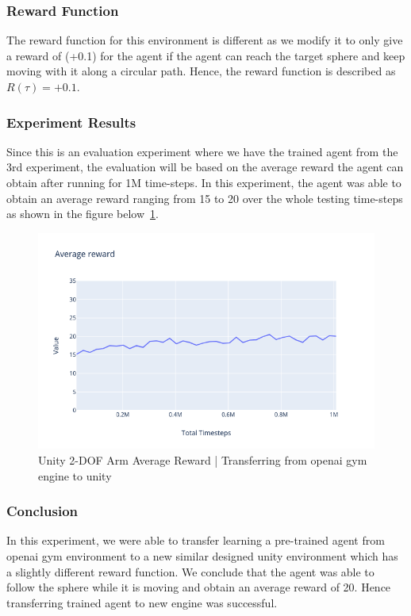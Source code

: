 \subsubsection{Reward Function}

The reward function for this environment is different as we modify it to only give a reward of (+0.1) for the agent if the agent can reach the target sphere and keep moving with it along a circular path. Hence, the reward function is described as \textbf{\(R(\tau)=+0.1\)}.

\subsubsection{Experiment Results}

Since this is an evaluation experiment where we have the trained agent from the 3rd experiment, the evaluation will be based on the average reward the agent can obtain after running for 1M time-steps. In this experiment, the agent was able to obtain an average reward ranging from 15 to 20 over the whole testing time-steps as shown in the figure below~\ref{fig:unity2d_avg_reward}.

\begin{figure}[!htb]
		\centering
		\includegraphics[width=0.7\linewidth]{figures/exps/unity2d.png}
		\caption{Unity 2-DOF Arm Average Reward | Transferring from openai gym engine to unity}
		\label{fig:unity2d_avg_reward}
\end{figure}


\subsubsection{Conclusion}

In this experiment, we were able to transfer learning a pre-trained agent from openai gym environment to a new similar designed unity environment which has a slightly different reward function. We conclude that the agent was able to follow the sphere while it is moving and obtain an average reward of 20. Hence transferring trained agent to new engine was successful.